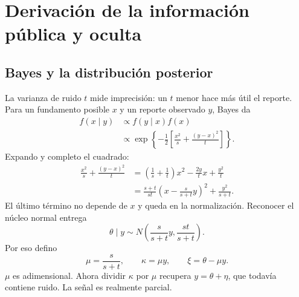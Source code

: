 \documentclass[11pt]{article}
\begin{document}
\section{Derivación de la información pública y oculta}
\subsection{Bayes y la distribución posterior}
La varianza de ruido $t$ mide imprecisión: un $t$ menor hace más útil el
reporte. Para un fundamento posible $x$ y un reporte observado $y$, Bayes da
\begin{align}
 f(x\mid y)&\propto f(y\mid x)f(x)\\
 &\propto \exp\left\{-\frac12
       \left[\frac{x^2}{s}+\frac{(y-x)^2}{t}\right]\right\}.
\end{align}
Expando y completo el cuadrado:
\begin{align}
 \frac{x^2}{s}+\frac{(y-x)^2}{t}
 &=\left(\frac1s+\frac1t\right)x^2-\frac{2y}{t}x+\frac{y^2}{t}\\
 &=\frac{s+t}{st}\left(x-\frac{s}{s+t}y\right)^2+\frac{y^2}{s+t}.
 \label{eq:posterior-square}
\end{align}
El último término no depende de $x$ y queda en la normalización. Reconocer
el núcleo normal entrega
\begin{equation}\label{eq:posterior}
 \theta\mid y\sim N\left(\frac{s}{s+t}y,\frac{st}{s+t}\right).
\end{equation}
Por eso defino
\begin{equation}\label{eq:mu}
 \mu=\frac{s}{s+t},\qquad \kappa=\mu y,\qquad \xi=\theta-\mu y.
\end{equation}
$\mu$ es adimensional. Ahora dividir $\kappa$ por $\mu$ recupera
$y=\theta+\eta$, que todavía contiene ruido. La señal es realmente parcial.
\end{document}
